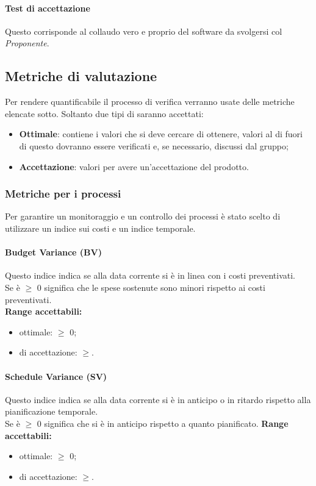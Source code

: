 \documentclass{scalatekids-article}
\begin{document}
\paragraph{Test di accettazione}
Questo corrisponde al collaudo vero e proprio del software da svolgersi col \textit{Proponente}.
\subsection{Metriche di valutazione}
Per rendere quantificabile il processo di verifica verranno usate delle metriche elencate sotto. Soltanto due tipi di  saranno accettati:
\begin{itemize}
  \item \textbf{Ottimale}: contiene i valori che si deve cercare di ottenere, valori al di fuori di questo  dovranno essere verificati e, se necessario, discussi dal gruppo;
  \item \textbf{Accettazione}: valori per avere un'accettazione del prodotto.
\end{itemize}
\subsubsection{Metriche per i processi}
\label{sec:metricheProcesso}
Per garantire un monitoraggio e un controllo dei processi è stato scelto di utilizzare un indice sui costi e un indice temporale. %
\paragraph{Budget Variance (BV)}
Questo indice indica se alla data corrente si è in linea con i costi preventivati.\\
Se  è $\geq$ 0 significa che le spese sostenute sono minori rispetto ai costi preventivati.\\
\textbf{Range accettabili:}
\begin{itemize}
  \item {} ottimale: $\geq$ 0;
  \item {} di accettazione: $\geq$. %
\end{itemize}
\paragraph{Schedule Variance (SV)}
Questo indice indica se alla data corrente si è in anticipo o in ritardo rispetto alla pianificazione temporale.\\
Se  è $\geq$ 0 significa che si è in anticipo rispetto a quanto pianificato.
\textbf{Range accettabili:}
\begin{itemize}
  \item {} ottimale: $\geq$ 0;
  \item {} di accettazione: $\geq$. %
\end{itemize}
\end{document}
